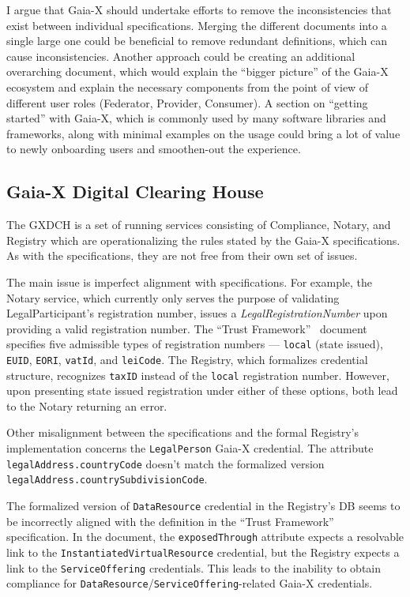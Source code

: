 I argue that Gaia-X should undertake efforts to remove the inconsistencies that exist between individual specifications.
Merging the different documents into a single large one could be beneficial to remove redundant definitions, which can cause inconsistencies.
Another approach could be creating an additional overarching document, which would explain the ``bigger picture'' of the Gaia-X ecosystem and explain the necessary components from the point of view of different user roles (Federator, Provider, Consumer).
A section on ``getting started'' with Gaia-X, which is commonly used by many software libraries and frameworks, along with minimal examples on the usage could bring a lot of value to newly onboarding users and smoothen-out the experience.

\subsection{Gaia-X Digital Clearing House}\label{subsec:gaia-x-digital-clearing-house}

The GXDCH is a set of running services consisting of Compliance, Notary, and Registry which are operationalizing the rules stated by the Gaia-X specifications.
As with the specifications, they are not free from their own set of issues.

The main issue is imperfect alignment with specifications.
For example, the Notary service, which currently only serves the purpose of validating LegalParticipant's registration number, issues a \textit{LegalRegistrationNumber} upon providing a valid registration number.
The ``Trust Framework''~\cite{gaiax_trust_framework} document specifies five admissible types of registration numbers --- \texttt{local} (state issued), \texttt{EUID}, \texttt{EORI}, \texttt{vatId}, and \texttt{leiCode}.
The Registry, which formalizes credential structure, recognizes \texttt{taxID} instead of the \texttt{local} registration number.
However, upon presenting state issued registration under either of these options, both lead to the Notary returning an error.

Other misalignment between the specifications and the formal Registry's implementation concerns the \texttt{LegalPerson} Gaia-X credential.
The attribute \texttt{legalAddress.countryCode} doesn't match the formalized version \texttt{legalAddress.countrySubdivisionCode}.

The formalized version of \texttt{DataResource} credential in the Registry's DB seems to be incorrectly aligned with the definition in the ``Trust Framework''~\cite{gaiax_trust_framework} specification.
In the document, the \texttt{exposedThrough} attribute expects a resolvable link to the \texttt{InstantiatedVirtualResource} credential, but the Registry expects a link to the \texttt{ServiceOffering} credentials.
This leads to the inability to obtain compliance for \texttt{DataResource}/\texttt{ServiceOffering}-related Gaia-X credentials.

